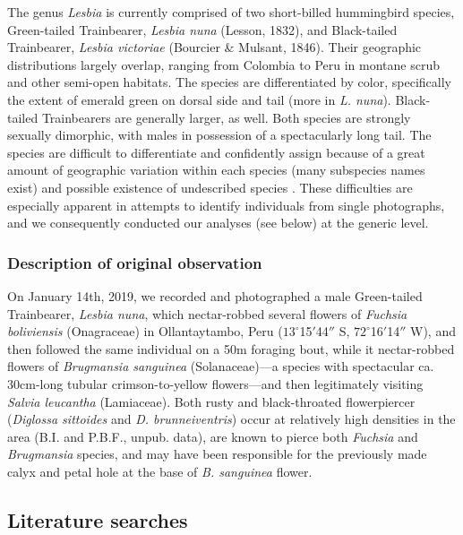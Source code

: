 \documentclass[fleqn,10pt,lineno]{wlpeerj}
\begin{document}
The genus \textit{Lesbia} is currently comprised of two short-billed hummingbird species, Green-tailed Trainbearer, \textit{Lesbia nuna} (Lesson, 1832), and Black-tailed Trainbearer, \textit{Lesbia victoriae} (Bourcier \& Mulsant, 1846). 
Their geographic distributions largely overlap, ranging from Colombia to Peru in montane scrub and other semi-open habitats. 
The species are differentiated by color, specifically the extent of emerald green on dorsal side and tail (more in \textit{L. nuna}). 
Black-tailed Trainbearers are generally larger, as well. 
Both species are strongly sexually dimorphic, with males in possession of a spectacularly long tail.
The species are difficult to differentiate and confidently assign because of a great amount of geographic variation within each species (many subspecies names exist) and possible existence of undescribed species \citep{weller2004,stiles2004}. %
These difficulties are especially apparent in attempts to identify individuals from single photographs, and we consequently conducted our analyses (see below) at the generic level.

\subsubsection*{Description of original observation} %

On January 14th, 2019, we recorded and photographed a male Green-tailed Trainbearer, \textit{Lesbia nuna}, which nectar-robbed several flowers of \textit{Fuchsia boliviensis} (Onagraceae) in Ollantaytambo, Peru ($13^{\circ}$15$'$44$''$ S, $72^{\circ}$16$'$14$''$ W), and then followed the same individual on a 50m foraging bout, while it nectar-robbed flowers of \textit{Brugmansia sanguinea} (Solanaceae)---a species with spectacular ca. 30cm-long tubular crimson-to-yellow flowers---and then legitimately visiting \textit{Salvia leucantha} (Lamiaceae). Both rusty and black-throated flowerpiercer (\textit{Diglossa sittoides} and \textit{D. brunneiventris}) occur at relatively high densities in the area (B.I. and P.B.F., unpub. data), are known to pierce both \textit{Fuchsia} and \textit{Brugmansia} species, and may have been responsible for the previously made calyx and petal hole at the base of \textit{B. sanguinea} flower.

\subsection*{Literature searches}
\end{document}
